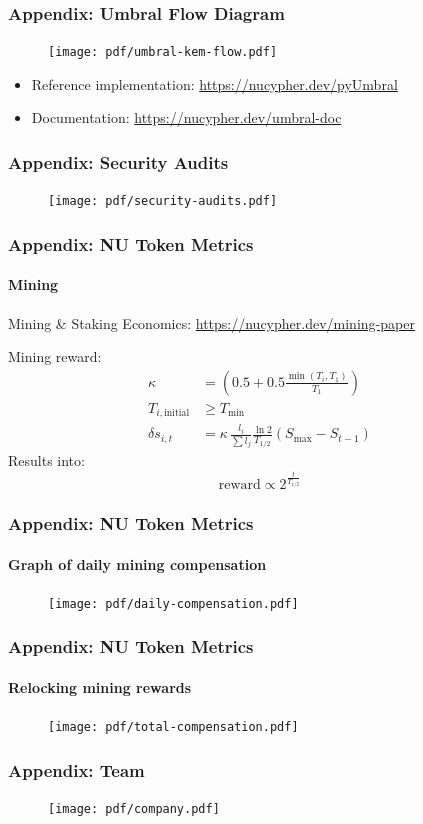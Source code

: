 \documentclass[xetex,mathsans,sans,aspectratio=169]{beamer}
\begin{document}
    \begin{frame}
      \frametitle{Appendix: Umbral Flow Diagram}
      \begin{figure}
        \centering
        \texttt{[image: pdf/umbral-kem-flow.pdf]}
      \end{figure}
      \begin{itemize}
           \item Reference implementation: \url{https://nucypher.dev/pyUmbral}
           \item Documentation: \url{https://nucypher.dev/umbral-doc}
      \end{itemize}
    \end{frame}

    \begin{frame}
        \frametitle{Appendix: Security Audits}
        \begin{figure}
            \centering
            \texttt{[image: pdf/security-audits.pdf]}
      \end{figure}
    \end{frame}

    \begin{frame}
        \frametitle{Appendix: NU Token Metrics}
        \framesubtitle{Mining}
        Mining \& Staking Economics: \url{https://nucypher.dev/mining-paper}

        \bigskip

        Mining reward:
        \begin{align}
            \kappa &= \left(0.5 + 0.5\frac{\min(T_i, T_1)}{T_1}\right) \nonumber \\
            T_{i,\text{initial}} &\ge T_{\min} \nonumber \\
            \delta s_{i,t} &=  \kappa\, \frac{l_i}{\sum l_j} \frac{\ln{2}}{T_{1/2}} \left( S_{\max} - S_{t-1}\right) \nonumber
        \end{align}
        Results into:
        $$\text{reward} \propto 2^{\frac{t}{T_{1/2}}}$$
    \end{frame}

    \begin{frame}
        \frametitle{Appendix: NU Token Metrics}
        \framesubtitle{Graph of daily mining compensation}
        \begin{figure}
            \centering
            \texttt{[image: pdf/daily-compensation.pdf]}
        \end{figure}
    \end{frame}

    \begin{frame}
        \frametitle{Appendix: NU Token Metrics}
        \framesubtitle{Relocking mining rewards}
        \begin{figure}
            \centering
            \texttt{[image: pdf/total-compensation.pdf]}
        \end{figure}
    \end{frame}

    \begin{frame}
      \frametitle{Appendix: Team}
        \begin{figure}
            \centering
            \texttt{[image: pdf/company.pdf]}
        \end{figure}
    \end{frame}
\end{document}
